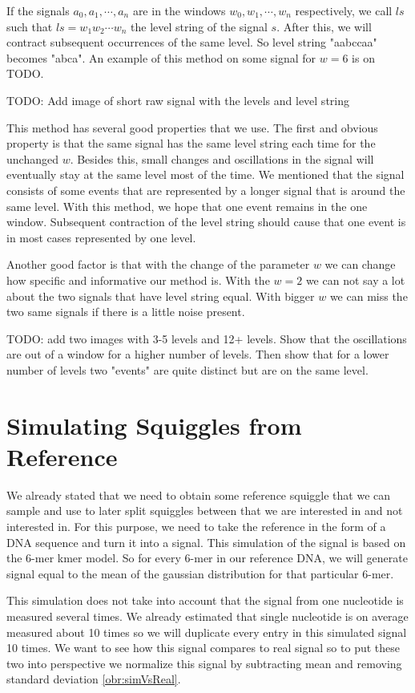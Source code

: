 If the signals $a_0, a_1, \cdots, a_n$ are in the windows $w_0, w_1, \cdots ,w_n$
respectively, we call $ls$ such that $ls=w_1w_2\cdots w_n$ the level string of the
signal $s$. After this, we will contract subsequent occurrences of the same level.
So level string "aabccaa" becomes "abca". An example of this method on some signal
for $w=6$ is on TODO. 

TODO: Add image of short raw signal with the levels and level string

This method has several good properties that we use. The first and obvious
property is that the same signal has the same level string each time for the unchanged $w$. Besides this, small changes and
oscillations in the signal will eventually stay at the same level most of the time.
We mentioned that the signal consists of some events that are represented by a longer signal that is around the same level.
With this method, we hope that one event remains in the one window. Subsequent
contraction of the level string should cause that one event is in most cases represented by
one level.

Another good factor is that with the change of the parameter $w$ we can change how specific
and informative our method is. With the $w=2$ we can not say a lot about the two signals
that have level string equal. With bigger $w$ we can miss the two same signals
if there is a little noise present.

TODO: add two images with 3-5 levels and 12+ levels. Show that the oscillations are
out of a window for a higher number of levels. Then show that for a lower number of levels
two "events" are quite distinct but are on the same level.

\section{Simulating Squiggles from Reference}

We already stated that we need to obtain some reference squiggle that we
can sample and use to later split squiggles between that we are interested in and not
interested in. For this purpose, we need to take the reference in the form of a DNA sequence
and turn it into a signal. This simulation of the signal is based on the 6-mer kmer model.
So for every 6-mer in our reference DNA, we will generate signal equal to the mean
of the gaussian distribution for that particular 6-mer.

This simulation does not take into account that the signal from one nucleotide is
measured several times. We already estimated that single nucleotide is on average
measured about 10 times so we will duplicate every entry in this simulated signal
10 times. We want to see how this signal compares to real signal so to put these
two into perspective we normalize this signal by subtracting mean and removing
standard deviation \ref{obr:simVsReal}.

